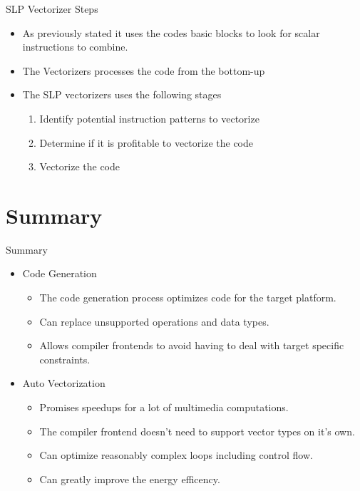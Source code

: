 \documentclass[]{beamer}
\begin{document}
\begin{frame}{SLP Vectorizer Steps}
\begin{itemize}
  \item As previously stated it uses the codes basic blocks to look for scalar instructions to combine.
  \item The Vectorizers processes the code from the bottom-up
  \item The SLP vectorizers uses the following stages
\begin{enumerate}
  \item Identify potential instruction patterns to vectorize
  \item Determine if it is profitable to vectorize the code
  \item Vectorize the code
\end{enumerate}
\end{itemize}
\end{frame}


\section{Summary}
\begin{frame}{Summary}
\begin{itemize}
  \item Code Generation
  \begin{itemize}
    \item The code generation process optimizes code for the target platform.
    \item Can replace unsupported operations and data types.
    \item Allows compiler frontends to avoid having to deal with target specific constraints.
  \end{itemize}

  \item Auto Vectorization
  \begin{itemize}
    \item Promises speedups for a lot of multimedia computations.
    \item The compiler frontend doesn't need to support vector types on it's own.
    \item Can optimize reasonably complex loops including control flow.
    \item Can greatly improve the energy efficency.
  \end{itemize}
\end{itemize}
\end{frame}
\end{document}
